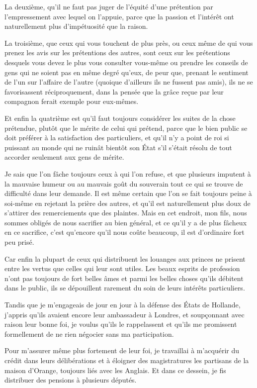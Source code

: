\documentclass[french,twoside]{book} %
\begin{document}
La deuxième, qu’il ne faut pas juger de l’équité d’une prétention par l’empressement avec lequel on l’appuie, parce que la passion et l’intérêt ont naturellement plus d’impétuosité que la raison.\par
La troisième, que ceux qui vous touchent de plus près, ou ceux même de qui vous prenez les avis sur les prétentions des autres, sont ceux sur les prétentions desquels vous devez le plus vous consulter vous-même ou prendre les conseils de gens qui ne soient pas en même degré qu’eux, de peur que, prenant le sentiment de l’un sur l’affaire de l’autre (quoique d’ailleurs ils ne fussent pas amis), ils ne se favorisassent réciproquement, dans la pensée que la grâce reçue par leur compagnon ferait exemple pour eux-mêmes.\par
Et enfin la quatrième est qu’il faut toujours considérer les suites de la chose prétendue, plutôt que le mérite de celui qui prétend, parce que le bien public se doit préférer à la satisfaction des particuliers, et qu’il n’y a point de roi si puissant au monde qui ne ruinât bientôt son État s’il s’était résolu de tout accorder seulement aux gens de mérite.\par
Je sais que l’on fâche toujours ceux à qui l’on refuse, et que plusieurs imputent à la mauvaise humeur ou au mauvais goût du souverain tout ce qui se trouve de difficulté dans leur demande. Il est même certain que l’on se fait toujours peine à soi-même en rejetant la prière des autres, et qu’il est naturellement plus doux de s’attirer des remerciements que des plaintes. Mais en cet endroit, mon fils, nous sommes obligés de nous sacrifier au bien général, et ce qu’il y a de plus fâcheux en ce sacrifice, c’est qu’encore qu’il nous coûte beaucoup, il est d’ordinaire fort peu prisé.\par
Car enfin la plupart de ceux qui distribuent les louanges aux princes ne prisent entre les vertus que celles qui leur sont utiles. Les beaux esprits de profession n’ont pas toujours de fort belles âmes et parmi les belles choses qu’ils débitent dans le public, ils se dépouillent rarement du soin de leurs intérêts particuliers.\par
Tandis que je m’engageais de jour en jour à la défense des États de Hollande, j’appris qu’ils avaient encore leur ambassadeur à Londres, et soupçonnant avec raison leur bonne foi, je voulus qu’ils le rappelassent et qu’ils me promissent formellement de ne rien négocier sans ma participation.\par
Pour m’assurer même plus fortement de leur foi, je travaillai à m’acquérir du crédit dans leurs délibérations et à éloigner des magistratures les partisans de la maison d’Orange, toujours liés avec les Anglais. Et dans ce dessein, je fis distribuer des pensions à plusieurs députés.\par
\end{document}
